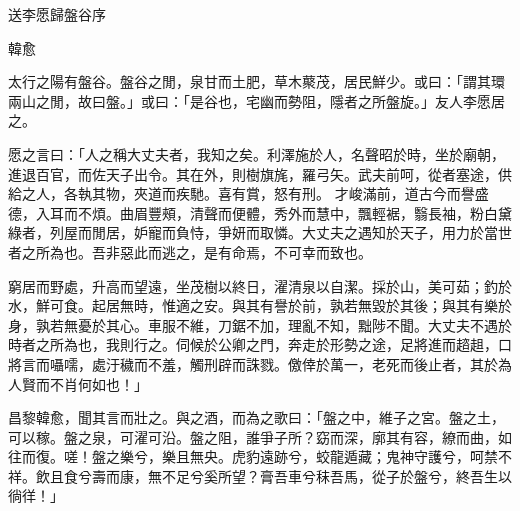 送李愿歸盤谷序

韓愈

太行之陽有盤谷。盤谷之閒，泉甘而土肥，草木藂茂，居民鮮少。或曰：「謂其環兩山之閒，故曰盤。」或曰：「是谷也，宅幽而勢阻，隱者之所盤旋。」友人李愿居之。

愿之言曰：「人之稱大丈夫者，我知之矣。利澤施於人，名聲昭於時，坐於廟朝，進退百官，而佐天子出令。其在外，則樹旗旄，羅弓矢。武夫前呵，從者塞途，供給之人，各執其物，夾道而疾馳。喜有賞，怒有刑。
才峻滿前，道古今而譽盛德，入耳而不煩。曲眉豐頰，清聲而便體，秀外而慧中，飄輕裾，翳長袖，粉白黛綠者，列屋而閒居，妒寵而負恃，爭妍而取憐。大丈夫之遇知於天子，用力於當世者之所為也。吾非惡此而逃之，是有命焉，不可幸而致也。

窮居而野處，升高而望遠，坐茂樹以終日，濯清泉以自潔。採於山，美可茹；釣於水，鮮可食。起居無時，惟適之安。與其有譽於前，孰若無毀於其後；與其有樂於身，孰若無憂於其心。車服不維，刀鋸不加，理亂不知，黜陟不聞。大丈夫不遇於時者之所為也，我則行之。伺候於公卿之門，奔走於形勢之途，足將進而趦趄，口將言而囁嚅，處汙穢而不羞，觸刑辟而誅戮。儌倖於萬一，老死而後止者，其於為人賢而不肖何如也！」

昌黎韓愈，聞其言而壯之。與之酒，而為之歌曰：「盤之中，維子之宮。盤之土，可以稼。盤之泉，可濯可沿。盤之阻，誰爭子所？窈而深，廓其有容，繚而曲，如往而復。嗟！盤之樂兮，樂且無央。虎豹遠跡兮，蛟龍遁藏；鬼神守護兮，呵禁不祥。飲且食兮壽而康，無不足兮奚所望？膏吾車兮秣吾馬，從子於盤兮，終吾生以徜徉！」